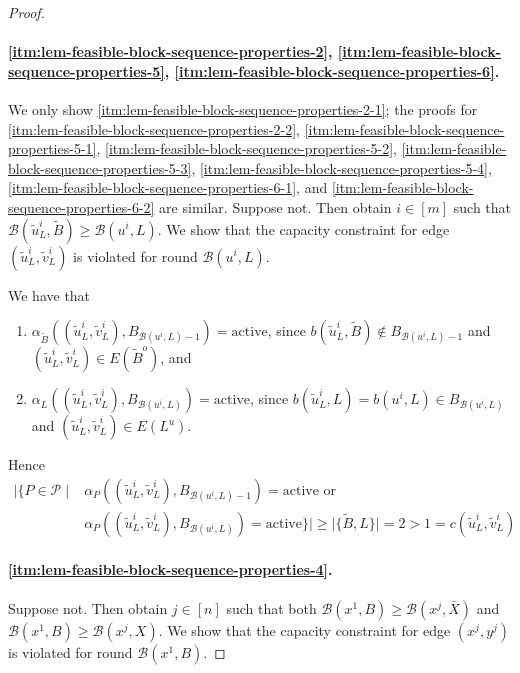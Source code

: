 \documentclass[fontsize=11pt,paper=a4]{book}
\begin{document}
\begin{proof}
\paragraph{\ref{itm:lem-feasible-block-sequence-properties-2}, \ref{itm:lem-feasible-block-sequence-properties-5}, \ref{itm:lem-feasible-block-sequence-properties-6}.}
We only show \ref{itm:lem-feasible-block-sequence-properties-2-1}; the proofs for \ref{itm:lem-feasible-block-sequence-properties-2-2}, \ref{itm:lem-feasible-block-sequence-properties-5-1}, \ref{itm:lem-feasible-block-sequence-properties-5-2}, \ref{itm:lem-feasible-block-sequence-properties-5-3}, \ref{itm:lem-feasible-block-sequence-properties-5-4}, \ref{itm:lem-feasible-block-sequence-properties-6-1}, and \ref{itm:lem-feasible-block-sequence-properties-6-2} are similar.
Suppose not.
Then obtain \(i\in[m]\) such that \(\mathcal{B}(\tilde{u}_L^i,\tilde{B})\geq\mathcal{B}(u^i,L)\).
We show that the capacity constraint for edge \((\tilde{u}_L^i,\tilde{v}_L^i)\) is violated for round \(\mathcal{B}(u^i,L)\).

We have that

\begin{enumerate}
\item \(\alpha_{\tilde{B}}((\tilde{u}_L^i,\tilde{v}_L^i),B_{\mathcal{B}(u^i,L)-1})=\mathrm{active}\), since \(b(\tilde{u}_L^i,\tilde{B})\notin B_{\mathcal{B}(u^i,L)-1}\) and \((\tilde{u}_L^i,\tilde{v}_L^i)\in E(\tilde{B}^o)\), and

\item \(\alpha_L((\tilde{u}_L^i,\tilde{v}_L^i),B_{\mathcal{B}(u^i,L)})=\mathrm{active}\), since \(b(\tilde{u}_L^i,L)=b(u^i,L)\in B_{\mathcal{B}(u^i,L)}\) and \((\tilde{u}_L^i,\tilde{v}_L^i)\in E(L^u)\).
\end{enumerate}

Hence
\begin{align*}
\lvert\{P\in\mathcal{P}\mid&\alpha_P((\tilde{u}_L^i,\tilde{v}_L^i),B_{\mathcal{B}(u^i,L)-1})=\mathrm{active}\text{ or }\\
&\alpha_P((\tilde{u}_L^i,\tilde{v}_L^i),B_{\mathcal{B}(u^i,L)})=\mathrm{active}\}\rvert\geq\lvert\{\tilde{B},L\}\rvert=2>1=c(\tilde{u}_L^i,\tilde{v}_L^i)
\end{align*}

\paragraph{\ref{itm:lem-feasible-block-sequence-properties-4}.}
Suppose not.
Then obtain \(j\in[n]\) such that both \(\mathcal{B}(x^1,B)\geq\mathcal{B}(x^j,\bar{X})\) and \(\mathcal{B}(x^1,B)\geq\mathcal{B}(x^j,X)\).
We show that the capacity constraint for edge \((x^j,y^j)\) is violated for round \(\mathcal{B}(x^1,B)\).


\end{proof}
\end{document}
